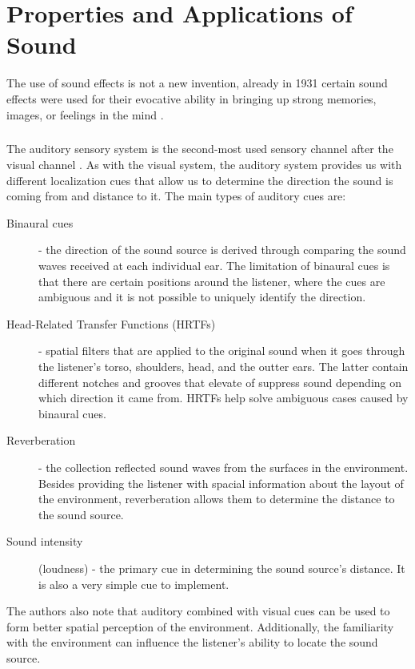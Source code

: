 \chapter{Properties and Applications of Sound} %

The use of sound effects is not a new invention, already in 1931 certain sound effects were used for their evocative ability in bringing up strong memories, images, or feelings in the mind \cite{bbc_yearbook_1931}.


\paragraph[Sound properties]{} 
The auditory sensory system is the second-most used sensory channel after the visual channel \cite[p.~46]{jr_3d_2017}. As with the visual system, the auditory system provides us with different localization cues that allow us to determine the direction the sound is coming from and distance to it. The main types of auditory cues are:
\begin{description}
	\item[Binaural cues] - the direction of the sound source is derived through comparing the sound waves received at each individual ear. The limitation of binaural cues is that there are certain positions around the listener, where the cues are ambiguous and it is not possible to uniquely identify the direction.
	\item[Head-Related Transfer Functions (HRTFs)] - spatial filters that are applied to the original sound when it goes through the listener's torso, shoulders, head, and the outter ears. The latter contain different notches and grooves that elevate of suppress sound depending on which direction it came from. HRTFs help solve ambiguous cases caused by binaural cues.
	\item[Reverberation] - the collection reflected sound waves from the surfaces in the environment. Besides providing the listener with spacial information about the layout of the environment, reverberation allows them to determine the distance to the sound source.
	\item[Sound intensity] (loudness) - the primary cue in determining the sound source's distance. It is also a very simple cue to implement.
\end{description}
The authors also note that auditory combined with visual cues can be used to form better spatial perception of the environment. Additionally, the familiarity with the environment can influence the listener's ability to locate the sound source.

